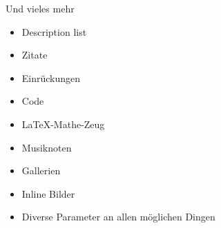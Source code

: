 \documentclass{beamer}
\begin{document}
	\begin{frame}{Und vieles mehr}
		\begin{itemize}
			\item Description list
			\item Zitate
			\item Einrückungen
			\item Code
			\item LaTeX-Mathe-Zeug
			\item Musiknoten
			\item Gallerien
			\item Inline Bilder
			\item Diverse Parameter an allen möglichen Dingen
		\end{itemize}
	\end{frame}
	
		
	
	
	
	
	
\end{document}
